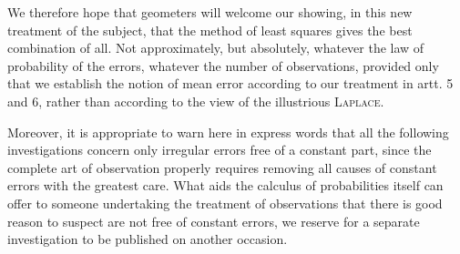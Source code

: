 We therefore hope that geometers will welcome our showing, in this new treatment of the subject, that the method of least squares gives the best combination of all. Not approximately, but absolutely, whatever the law of probability of the errors, whatever the number of observations, provided only that we establish the notion of mean error according to our treatment in artt. 5 and 6, rather than according to the view of the illustrious \textsc{Laplace}.

Moreover, it is appropriate to warn here in express words that all the following investigations concern only irregular errors free of a constant part, since the complete art of observation properly requires removing all causes of constant errors with the greatest care. What aids the calculus of probabilities itself can offer to someone undertaking the treatment of observations that there is good reason to suspect are not free of constant errors, we reserve for a separate investigation to be published on another occasion.

\clearpage
